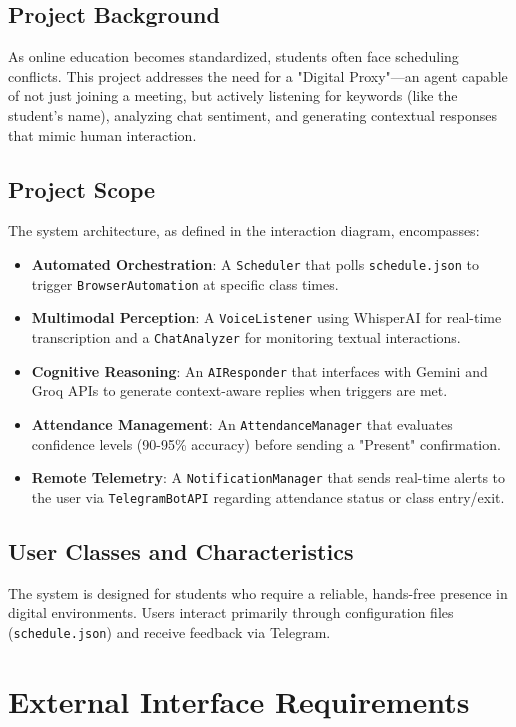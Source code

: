 \documentclass[12pt]{article}
\begin{document}
\subsection{Project Background}
As online education becomes standardized, students often face scheduling conflicts. This project addresses the need for a "Digital Proxy"—an agent capable of not just joining a meeting, but actively listening for keywords (like the student's name), analyzing chat sentiment, and generating contextual responses that mimic human interaction.

\subsection{Project Scope}
The system architecture, as defined in the interaction diagram, encompasses:
\begin{itemize}
    \item \textbf{Automated Orchestration}: A \texttt{Scheduler} that polls \texttt{schedule.json} to trigger \texttt{BrowserAutomation} at specific class times.
    \item \textbf{Multimodal Perception}: A \texttt{VoiceListener} using WhisperAI for real-time transcription and a \texttt{ChatAnalyzer} for monitoring textual interactions.
    \item \textbf{Cognitive Reasoning}: An \texttt{AIResponder} that interfaces with Gemini and Groq APIs to generate context-aware replies when triggers are met.
    \item \textbf{Attendance Management}: An \texttt{AttendanceManager} that evaluates confidence levels (90-95\% accuracy) before sending a "Present" confirmation.
    \item \textbf{Remote Telemetry}: A \texttt{NotificationManager} that sends real-time alerts to the user via \texttt{TelegramBotAPI} regarding attendance status or class entry/exit.
\end{itemize}

\subsection{User Classes and Characteristics}
The system is designed for students who require a reliable, hands-free presence in digital environments. Users interact primarily through configuration files (\texttt{schedule.json}) and receive feedback via Telegram.

\section{External Interface Requirements}
\end{document}
